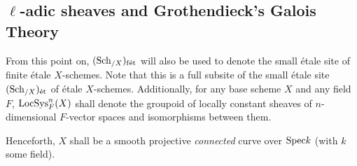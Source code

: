     \subsection{\texorpdfstring{$\ell$}{}-adic sheaves and Grothendieck's Galois Theory}
        \begin{convention}
            From this point on, $(\mathrm{Sch}_{/X})_{\mathrm{f\acute{e}t}}$ will also be used to denote the small \'etale site of finite \'etale $X$-schemes. Note that this is a full subsite of the small \'etale site $(\mathrm{Sch}_{/X})_{\mathrm{\acute{e}t}}$ of \'etale $X$-schemes. Additionally, for any base scheme $X$ and any field $F$, $\mathrm{LocSys}^n_F(X)$ shall denote the groupoid of locally constant sheaves of $n$-dimensional $F$-vector spaces and isomorphisms between them.  
        \end{convention}
        \begin{convention} \label{conv: base_curve}
            Henceforth, $X$ shall be a smooth projective \textit{connected} curve over $\mathrm{Spec} k$ (with $k$ some field).
        \end{convention}
        

